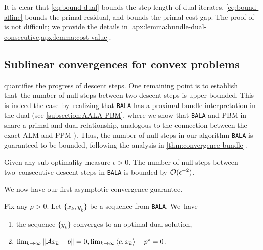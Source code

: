 \documentclass[11pt]{article}
\newcommand{\alg}{\texttt{BALA}}%
\begin{document}
It is clear that \cref{eq:bound-dual} bounds the step length of dual iterates, \cref{eq:bound-affine} bounds the primal residual, and  bounds the primal cost gap. The proof of  is not difficult; we provide the details in \cref{apx:lemma:bundle-dual-consecutive,apx:lemma:cost-value}. 

\subsection{Sublinear convergences for convex problems}
\label{subsection:sublinear}

 quantifies the progress of descent steps. One remaining point is to establish that~the number of null steps between two descent steps is upper bounded. This is indeed the case~by~realizing that \alg{} has a proximal bundle interpretation in the dual (see \cref{subsection:AALA-PBM}, where we show that \alg{} and PBM in  share a primal and dual relationship, analogous to the connection between the exact ALM and PPM \cite{rockafellar1976augmented}). Thus, the number of null steps in our algorithm \alg{} is guaranteed to be bounded, following the analysis in \cref{thm:convergence-bundle}.

\begin{lemma} \label{lemma:null-steps}
Given any sub-optimality measure $\epsilon > 0$. The number of null steps between two~consecutive descent steps in \alg{} is bounded by $\mathcal{O}(\epsilon^{-2})$.   
\end{lemma}

We now have our first asymptotic convergence guarantee. 

\begin{theorem}
    \label{theorem:asymptotic}
    Fix any $\rho > 0$. Let $\{x_k,y_k\}$ be a sequence from \alg{}. We~have 
    \begin{enumerate}[leftmargin=*]
        \item the sequence $\{y_k\}$ converges to an optimal dual solution,
        \item  $\lim_{k\to \infty} \|\mathcal{A} x_{k} - b\| = 0,\lim_{k\to \infty} \left \langle c, x_{k} \right\rangle - p^\star = 0 $. 
    \end{enumerate}
\end{theorem}
\end{document}
